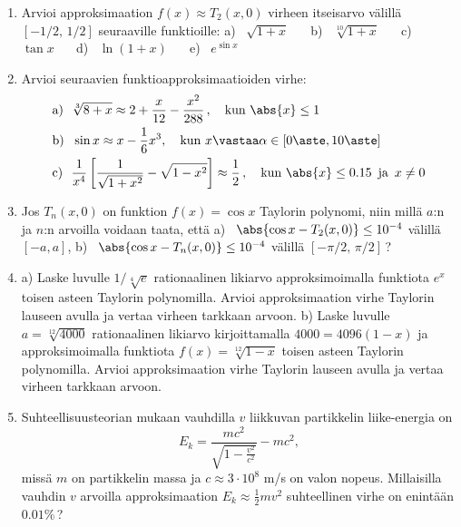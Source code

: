 \begin{enumerate}
\item
Arvioi approksimaation $f(x) \approx T_2(x,0)$ virheen itseisarvo välillä $[-1/2,\,1/2]$
seuraaville funktioille: \vspace{1mm}\newline
a) \, $\sqrt{1+x}\quad\,\ $ 
b) \, $\sqrt[10]{1+x}\quad\,\ $ 
c) \, $\tan x\quad\,\ $ 
d) \, $\ln(1+x)\quad\,\ $ 
e) \, $e^{\sin x}$   

\item
Arvioi seuraavien funktioapproksimaatioiden virhe:
\begin{align*}
&\text{a)}\ \ \sqrt[3]{8+x} \approx 2+\frac{x}{12}-\frac{x^2}{288}\,, \quad 
                                         \text{kun}\ \abs{x} \le 1 \\
&\text{b)}\ \ \sin x \approx x-\frac{1}{6}x^3, \quad 
                                         \text{kun}\ x\vastaa\alpha\in[0\aste,10\aste] \\
&\text{c)}\ \ \frac{1}{x^4}\left[\frac{1}{\sqrt{1+x^2}}-\sqrt{1-x^2}\right] 
            \approx \frac{1}{2}\,, \quad \text{kun}\ \abs{x} \le 0.15\,\ \text{ja}\,\ x \neq 0
\end{align*}

\item
Jos $T_n(x,0)$ on funktion $f(x)=\cos x$ Taylorin polynomi, niin millä $a$:n ja $n$:n arvoilla
voidaan taata, että \newline
a) \ $\abs{\cos x-T_2(x,0)} \le 10^{-4}$ välillä $[-a,a]$, \newline
b) \ $\abs{\cos x-T_n(x,0)} \le 10^{-4}$ välillä $[-\pi/2,\,\pi/2]$\,?

\item
a) Laske luvulle $1/\sqrt[4]{e}$ rationaalinen likiarvo approksimoimalla funktiota $e^x$ toisen
asteen Taylorin polynomilla. Arvioi approksimaation virhe Taylorin lauseen avulla ja vertaa
virheen tarkkaan arvoon. \vspace{1mm}\newline
b) Laske luvulle $a=\sqrt[12]{4000}$ rationaalinen likiarvo kirjoittamalla $4000=4096(1-x)$ ja
approksimoimalla funktiota $f(x)=\sqrt[12]{1-x}$ toisen asteen Taylorin polynomilla. Arvioi
approksimaation virhe Taylorin lauseen avulla ja vertaa virheen tarkkaan arvoon.

\item
Suhteellisuusteorian mukaan vauhdilla $v$ liikkuvan partikkelin liike-energia on
\[
E_k = \frac{mc^2}{\sqrt{1-\frac{v^2}{c^2}}}-mc^2,
\]
missä $m$ on partikkelin massa ja $c \approx 3 \cdot 10^8$ m/s on valon nopeus. Millaisilla 
vauhdin $v$ arvoilla approksimaation $E_k \approx \frac{1}{2} mv^2$ suhteellinen virhe on
enintään $0.01\%$\,? 


\end{enumerate}
